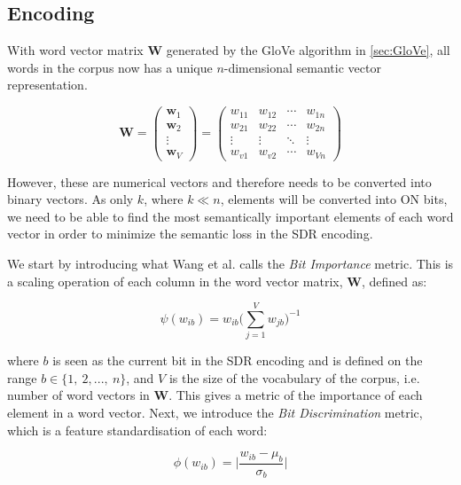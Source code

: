 \subsection{Encoding}
With word vector matrix $\boldsymbol{W}$ generated by the GloVe algorithm in \autoref{sec:GloVe}, all words in the corpus now has a unique $n$-dimensional semantic vector representation. 


\begin{equation}
    \boldsymbol{W} = \begin{pmatrix}
        \boldsymbol{w}_{1}\\
        \boldsymbol{w}_{2}\\
        \vdots\\
        \boldsymbol{w}_{V}
    \end{pmatrix} = \begin{pmatrix}
        w_{11}&w_{12}&\cdots &w_{1n} \\
        w_{21}&w_{22}&\cdots &w_{2n} \\
        \vdots & \vdots & \ddots & \vdots\\
        w_{v1}&w_{v2}&\cdots &w_{Vn}
    \end{pmatrix}
\end{equation}


\noindent However, these are numerical vectors and therefore needs to be converted into binary vectors. As only $k$, where $k \ll n$, elements will be converted into ON bits, we need to be able to find the most semantically important elements of each word vector in order to minimize the semantic loss in the SDR encoding.


We start by introducing what Wang et al. \cite{7844355} calls the \textit{Bit Importance} metric. This is a scaling operation of each column in the word vector matrix, $\boldsymbol{W}$, defined as:


\begin{equation}
    \psi(w_{ib}) = w_{ib}\Bigg( \sum\limits_{j=1}^{V} w_{jb} \Bigg)^{-1}
\end{equation}


\noindent where $b$ is seen as the current bit in the SDR encoding and is defined on the range $b \in \{1,\ 2,...,\ n\}$, and $V$ is the size of the vocabulary of the corpus, i.e. number of word vectors in $\boldsymbol{W}$. This gives a metric of the importance of each element in a word vector. Next, we introduce the \textit{Bit Discrimination} metric, which is a feature standardisation of each word:


\begin{equation}
    \phi(w_{ib}) = \Bigg| \frac{w_{ib} - \mu_b}{\sigma_b} \Bigg|
    \label{eq:BD}
\end{equation}


